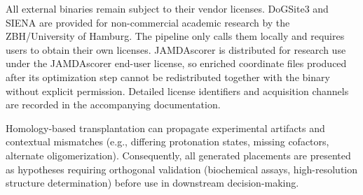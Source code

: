All external binaries remain subject to their vendor licenses. DoGSite3 and SIENA are provided for non-commercial academic research by the ZBH/University of Hamburg. The pipeline only calls them locally and requires users to obtain their own licenses. JAMDAscorer is distributed for research use under the JAMDAscorer end-user license, so enriched coordinate files produced after its optimization step cannot be redistributed together with the binary without explicit permission. Detailed license identifiers and acquisition channels are recorded in the accompanying documentation.

Homology-based transplantation can propagate experimental artifacts and contextual mismatches (e.g., differing protonation states, missing cofactors, alternate oligomerization). Consequently, all generated placements are presented as hypotheses requiring orthogonal validation (biochemical assays, high-resolution structure determination) before use in downstream decision-making.
